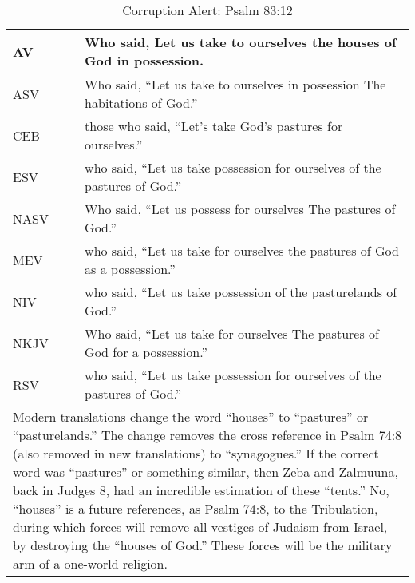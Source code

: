 \begin{center}

\begin{table}[ht]
\centering
\begin{tabular}{|p{.5in}|p{3.5in}|}
\hline

\textcolor[rgb]{0.00,0.00,1.00}{AV} & \textcolor[rgb]{0.00,0.00,1.00}{Who said, Let us take to ourselves the houses of God in possession.} \\ \hline 

\hline
\hline


ASV &  Who said, ``Let us take to ourselves in possession The habitations of God.'' \\ \hline
%
CEB &  those who said, ``Let’s take God’s pastures for ourselves.''\\ \hline
%
ESV & who said, ``Let us take possession for ourselves of the pastures of God.''\\ \hline
%
NASV &  Who said, ``Let us possess for ourselves The pastures of God.'' \\ \hline
%
MEV & who said, ``Let us take for ourselves the pastures of God as a possession.''\\ \hline
%
NIV &  who said, ``Let us take possession of the pasturelands of God.''\\ \hline
%
NKJV &  Who said, ``Let us take for ourselves The pastures of God for a possession.''\\ \hline
%
RSV &  who said, ``Let us take possession for ourselves of the pastures of God.''\\ \hline

\hline
\hline

\multicolumn{2}{|p{4.3in}|}{{\textcolor{jungle}{Modern translations change the word ``houses'' to ``pastures'' or ``pasturelands.'' The change removes the cross reference in Psalm 74:8 (also removed in new translations) to ``synagogues.'' If the correct word was ``pastures'' or something similar, then Zeba and Zalmuuna, back in Judges 8, had an incredible estimation of these ``tents.'' No, ``houses'' is a future references, as Psalm 74:8, to the Tribulation, during which forces will remove all vestiges of Judaism from Israel, by destroying the ``houses of God.'' These forces will be the military arm of a one-world religion.}}} \\ \hline

\end{tabular}
\caption[Corruption Alert: Psalm 83:12]{Corruption Alert: Psalm 83:12} \label{table:Corruption Psalm 83:12}

\end{table}

\end{center}

